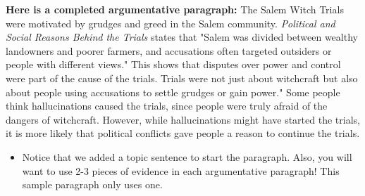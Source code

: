 \documentclass[12pt]{article}
\begin{document}
\begin{tcolorbox}[colframe=black!60, colback=white, 
coltitle=black, colbacktitle=black!15, fonttitle=\bfseries\Large, 
title=Examples, halign title=center, left=10pt, right=10pt, top=10pt, bottom=15pt]
\begin{itemize}
        \end{itemize}

     

\textbf{Here is a completed argumentative paragraph:} The Salem Witch Trials were motivated by grudges and greed in the Salem community. \textit{Political and Social Reasons Behind the Trials} states that "Salem was divided between wealthy landowners and poorer farmers, and accusations often targeted outsiders or people with different views." This shows that disputes over power and control were part of the cause of the trials. Trials were not just about witchcraft but also about people using accusations to settle grudges or gain power." Some people think hallucinations caused the trials, since people were truly afraid of the dangers of witchcraft. However, while hallucinations might have started the trials, it is more likely that political conflicts gave people a reason to continue the trials.
\begin{itemize}
    \item Notice that we added a topic sentence to start the paragraph. Also, you will want to use 2-3 pieces of evidence in each argumentative paragraph! This sample paragraph only uses one.
\end{itemize}




 


     \end{tcolorbox}
\vspace{1em}
\end{document}
